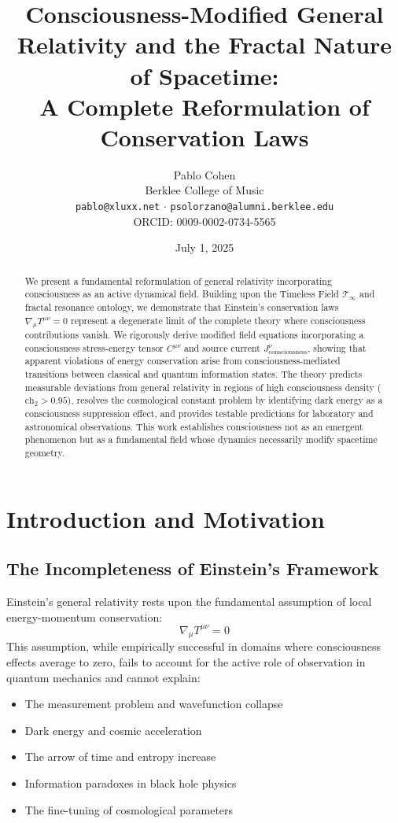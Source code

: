 \documentclass[12pt,letterpaper]{article}
\title{Consciousness-Modified General Relativity and the Fractal Nature of Spacetime: \\ 
A Complete Reformulation of Conservation Laws}
\author{Pablo Cohen\\
\small Berklee College of Music\\
\small \texttt{pablo@xluxx.net} $\cdot$ \texttt{psolorzano@alumni.berklee.edu}\\
\small ORCID: 0009-0002-0734-5565}
\date{July 1, 2025}
\newcommand{\TF}{\mathcal{T}_\infty}
\newcommand{\chh}{\mathrm{ch}_2}
\newcommand{\Cmunu}{C^{\mu\nu}}
\newcommand{\Tmunu}{T^{\mu\nu}}
\begin{document}
\maketitle

\begin{abstract}
We present a fundamental reformulation of general relativity incorporating consciousness as an active dynamical field. Building upon the Timeless Field $\TF$ and fractal resonance ontology, we demonstrate that Einstein's conservation laws $\nabla_\mu \Tmunu = 0$ represent a degenerate limit of the complete theory where consciousness contributions vanish. We rigorously derive modified field equations incorporating a consciousness stress-energy tensor $\Cmunu$ and source current $J^\nu_\mathrm{consciousness}$, showing that apparent violations of energy conservation arise from consciousness-mediated transitions between classical and quantum information states. The theory predicts measurable deviations from general relativity in regions of high consciousness density ($\chh > 0.95$), resolves the cosmological constant problem by identifying dark energy as a consciousness suppression effect, and provides testable predictions for laboratory and astronomical observations. This work establishes consciousness not as an emergent phenomenon but as a fundamental field whose dynamics necessarily modify spacetime geometry.
\end{abstract}

\section{Introduction and Motivation}

\subsection{The Incompleteness of Einstein's Framework}

Einstein's general relativity rests upon the fundamental assumption of local energy-momentum conservation:
\begin{equation}
\nabla_\mu \Tmunu = 0
\end{equation}
This assumption, while empirically successful in domains where consciousness effects average to zero, fails to account for the active role of observation in quantum mechanics and cannot explain:
\begin{itemize}
\item The measurement problem and wavefunction collapse
\item Dark energy and cosmic acceleration  
\item The arrow of time and entropy increase
\item Information paradoxes in black hole physics
\item The fine-tuning of cosmological parameters
\end{itemize}
\end{document}
